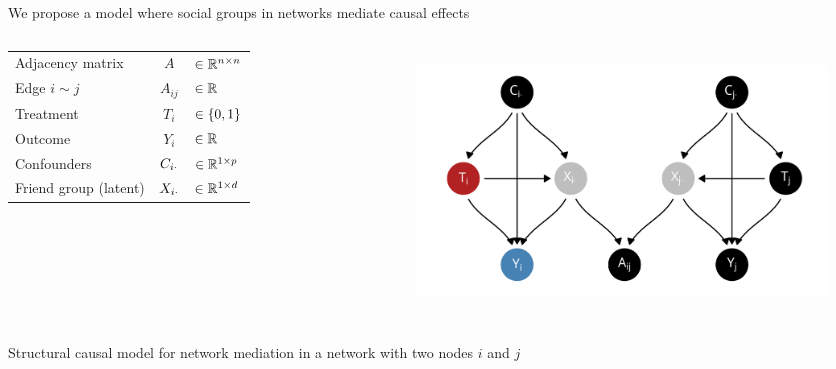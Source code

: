 \documentclass[aspectratio=169]{beamer}
\theoremstyle{remark}
\begin{document}
\begin{frame}{We propose a model where social groups in networks mediate causal effects}

    \begin{columns}


        \footnotesize

        \begin{table}[]
            \begin{tabular}{lcl}
                Adjacency matrix      & $A$            & $\in \mathbb{R}^{n \times n}$ \\
                Edge $i \sim j$       & $A_{ij}$       & $\in \mathbb{R}$              \\
                Treatment             & $T_i$          & $\in \{0, 1\}$      \\
                Outcome               & $Y_i$          & $\in \mathbb{R}$              \\
                Confounders           & $C_{i \cdot}$ & $\in \mathbb{R}^{1 \times p}$ \\
                Friend group (latent) & $X_{i \cdot}$ & $\in \mathbb{R}^{1 \times d}$
            \end{tabular}
        \end{table}


        \begin{figure}[ht]
            \centering
            \includegraphics[width=\textwidth]{figures/dags/homophily-mediating.png}
            \label{fig:mediating}
        \end{figure}
    \end{columns}

    \centering
    \scriptsize Structural causal model for network mediation in a network with two nodes $i$ and $j$



\end{frame}
\end{document}
